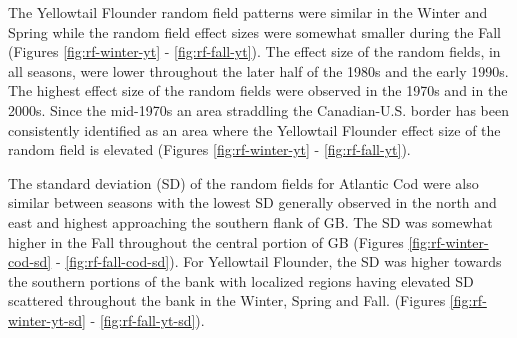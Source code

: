 \documentclass[
]{article}
\begin{document}
The Yellowtail Flounder random field patterns were similar in the Winter and Spring while the random field effect sizes were somewhat smaller during the Fall (Figures \ref{fig:rf-winter-yt} - \ref{fig:rf-fall-yt}). The effect size of the random fields, in all seasons, were lower throughout the later half of the 1980s and the early 1990s. The highest effect size of the random fields were observed in the 1970s and in the 2000s. Since the mid-1970s an area straddling the Canadian-U.S. border has been consistently identified as an area where the Yellowtail Flounder effect size of the random field is elevated (Figures \ref{fig:rf-winter-yt} - \ref{fig:rf-fall-yt}).

The standard deviation (SD) of the random fields for Atlantic Cod were also similar between seasons with the lowest SD generally observed in the north and east and highest approaching the southern flank of GB. The SD was somewhat higher in the Fall throughout the central portion of GB (Figures \ref{fig:rf-winter-cod-sd} - \ref{fig:rf-fall-cod-sd}). For Yellowtail Flounder, the SD was higher towards the southern portions of the bank with localized regions having elevated SD scattered throughout the bank in the Winter, Spring and Fall. (Figures \ref{fig:rf-winter-yt-sd} - \ref{fig:rf-fall-yt-sd}).
\end{document}

